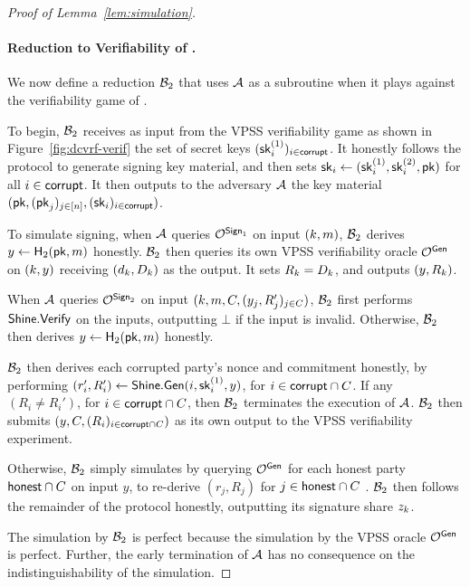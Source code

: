 \begin{proof}[Proof of Lemma~\ref{lem:simulation}]
  \paragraph{Reduction to Verifiability of \DVRFOne.}
  We now define a reduction $\mathcal{B}_2$ that uses $\mathcal{A}$ as a subroutine when it plays against the verifiability game of \DVRFOne.

  To begin,
  $\mathcal{B}_2$ receives as input from the VPSS verifiability game as shown in Figure~\ref{fig:dcvrf-verif} the set of  \DVRFOne secret keys $(\mathsf{sk}^{(1)}_i)_{i \in \mathsf{corrupt}}$.
  It honestly follows the protocol to generate signing key material,
  and then sets $\mathsf{sk}_i \gets (\mathsf{sk}^{(1)}_i, \mathsf{sk}^{(2)}_i, \mathsf{pk})$ for all $i \in \mathsf{corrupt}$.
  It then outputs to the adversary $\mathcal{A}$ the key material
  $(\mathsf{pk}, (\mathsf{pk}_j)_{j \in [n]}, \allowbreak (\mathsf{sk}_i)_{i \in \mathsf{corrupt}})$.

  To simulate signing,
  when $\mathcal{A}$ queries $\mathcal{O}^{\mathsf{Sign}_1}$ on input $(k, m)$,
  $\mathcal{B}_2$ derives $y \gets \mathsf{H}_2(\mathsf{pk}, m)$ honestly.
  $\mathcal{B}_2$ then queries its own VPSS verifiability oracle $\mathcal{O}^{\mathsf{Gen}}$ on $(k, y)$
  receiving $(d_k, D_k)$ as the output.
  It sets  $R_k = D_k$,
  and outputs $(y, R_k)$.

  When $\mathcal{A}$ queries $\mathcal{O}^{\mathsf{Sign}_2}$ on input
  $(k, m, C, (y_j, R_j')_{j \in C})$,
  $\mathcal{B}_2$ first performs $\mathsf{Shine}.\mathsf{Verify}$ on the inputs,
  outputting $\bot$ if the input is invalid.
  Otherwise,
  $\mathcal{B}_2$ then derives $y \gets \mathsf{H}_2(\mathsf{pk}, m)$ honestly.

  $\mathcal{B}_2$ then derives each corrupted party's nonce and commitment honestly,
  by performing
  $(r_i', R_i') \gets \mathsf{Shine}.\mathsf{Gen}(i, \mathsf{sk}^{(1)}_i, y)$, for $i \in \mathsf{corrupt} \cap C$.
  If any $(R_i \neq R_i')$, for $i \in \mathsf{corrupt} \cap C$,
  then $\mathcal{B}_2$ terminates the execution of $\mathcal{A}$.
  $\mathcal{B}_2$ then submits
  $(y, C, (R_i)_{i \in \mathsf{corrupt} \cap C})$
  as its own output to the VPSS verifiability experiment.

  Otherwise,
  $\mathcal{B}_2$ simply simulates by querying $\mathcal{O}^{\mathsf{Gen}}$ for each honest party $\mathsf{honest} \cap C$ on input $y$,
  to re-derive $(r_j, R_j)$  for $j \in \mathsf{honest} \cap C$ .
  $\mathcal{B}_2$ then follows the remainder of the protocol honestly,
  outputting its signature share $z_k$.

  The simulation by $\mathcal{B}_2$ is perfect because the simulation by the VPSS oracle  $\mathcal{O}^{\mathsf{Gen}}$ is perfect.
  Further, the early termination of $\mathcal{A}$ has no consequence on the indistinguishability of the simulation.


\end{proof}

